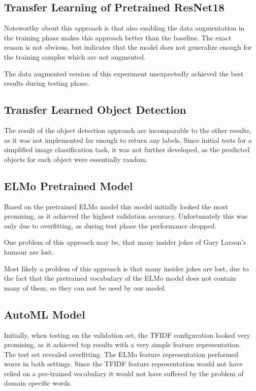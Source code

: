\documentclass[draft,final,oneside]{vutinfth} %
\begin{document}
\subsection{Transfer Learning of Pretrained ResNet18}
Noteworthy about this approach is that also enabling the data augmentation in the
training phase makes this approach better than the baseline. The exact reason is not
obvious, but indicates that the model does not generalize enough for the
training samples which are not augmented.

The data augmented version of this experiment unexpectedly achieved the best results
during testing phase.

\subsection{Transfer Learned Object Detection}

The result of the object detection approach are incomparable to the other results, as it was not implemented far enough to return any labels. Since initial tests for a simplified image classification task, it was not further developed, as the predicted objects for each object were essentially
random.

\subsection{ELMo Pretrained Model}

Based on the pretrained ELMo model this model initially looked the most promising, as it
achieved the highest validation accuracy. Unfortunately this was only due to overfitting,
as during test phase the performance dropped.

One problem of this approach may be, that many insider jokes of Gary Larson's humour are lost.

Most likely a problem of this approach is that many insider jokes are lost, due to the fact
that the pretrained vocabulary of the ELMo model does not contain many of them, so
they can not be used by our model.

\subsection{AutoML Model}
Initially, when testing on the validation set, the TFIDF configuration looked very promising, as it achieved top results with a very simple feature representation. The test set
revealed overfitting. The ELMo feature representation performed worse in both settings.
Since the TFIDF feature representation would not have relied on a pre-trained vocabulary
it would not have suffered by the problem of domain specific words.
\end{document}
